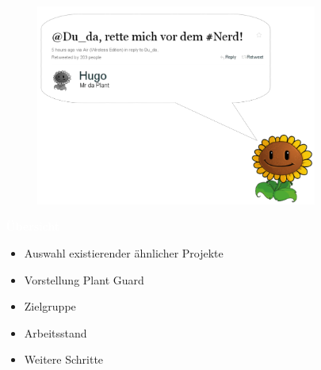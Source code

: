 \documentclass[bigger]{beamer}
\newcommand{\topic}[1]{{\huge{\textcolor{white}{\textbf{#1}}}}}
\begin{document}
{
%
\begin{frame}
\begin{figure}[H]
\includegraphics[width=350px]{SprechblaseOR.png}
\end{figure}

\end{frame}
}

\begin{frame}{\topic{Übersicht}}
   \begin{itemize}
      \item Auswahl existierender ähnlicher Projekte
      \item Vorstellung Plant Guard
      \item Zielgruppe
      \item Arbeitsstand
      \item Weitere Schritte
   \end{itemize}
\end{frame}
\end{document}
